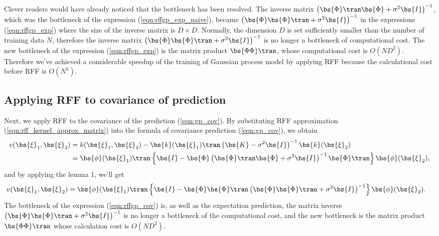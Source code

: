\documentclass[twocolumn,a4paper,10pt]{article}
\begin{document}
Clever readers would have already noticed that the bottleneck has been resolved.
The inverse matrix $\bigl( \bs{\Phi}\tran \bs{\Phi} + \sigma^2 \bs{I} \bigr)^{-1}$,
which was the bottleneck of the expression (\ref{eqn:rffgp_exp_naive}),
became $\bigl( \bs{\Phi} \bs{\Phi}\tran + \sigma^2 \bs{I} \bigr)^{-1}$ in the expressions (\ref{eqn:rffgp_exp})
where the size of the inverse matrix is $D \times D$.
Normally, the dimension $D$ is set sufficiently smaller than the number of training data $N$,
therefore the inverse matrix $\bigl( \bs{\Phi} \bs{\Phi}\tran + \sigma^2 \bs{I} \bigr)^{-1}$
is no longer a bottleneck of computational cost.
The new bottleneck of the expression (\ref{eqn:rffgp_exp}) is the matrix product $\bs{\Phi \Phi}\tran$,
whose computational cost is $O(ND^2)$.
Therefore we've achieved a considerable speedup of the training of Gaussian process model
by applying RFF because the calculational cost before RFF is $O(N^3)$.

\subsection{Applying RFF to covariance of prediction}

Next, we apply RFF to the covariance of the prediction (\ref{eqn:gp_cov}).
By substituting RFF approximation (\ref{eqn:rff_kernel_approx_matrix}) into the formula of
covariance prediction (\ref{eqn:gp_cov}), we obtain
\begin{align}
    v (\bs{\xi}_1, \bs{\xi}_2)
    &= k (\bs{\xi}_1, \bs{\xi}_2) - \bs{k} (\bs{\xi}_1)\tran
    \left( \bs{K} - \sigma^2 \bs{I} \right)^{-1} \bs{k} (\bs{\xi}_2) \notag \\
    &= \bs{\phi}(\bs{\xi}_1)\tran \left\{ \bs{I} - \bs{\Phi}
    \left( \bs{\Phi}\tran \bs{\Phi} + \sigma^2 \bs{I} \right)^{-1}
    \bs{\Phi}\tran \right\} \bs{\phi}(\bs{\xi}_2),
\end{align}
and by applying the lemma 1, we'll get
\begin{align}
    v (\bs{\xi}_1, \bs{\xi}_2)
    &= \bs{\phi}(\bs{\xi}_1)\tran \left\{ \bs{I} - \bs{\Phi} \bs{\Phi}\tran
    \left( \bs{\Phi} \bs{\Phi}\tran + \sigma^2 \bs{I} \right)^{-1} \right\} \bs{\phi}(\bs{\xi}_2).
    \label{eqn:rffgp_cov}
\end{align}
The bottleneck of the expression (\ref{eqn:rffgp_cov}) is, as well as the expectation prediction,
the matrix inverse $\left( \bs{\Phi} \bs{\Phi}\tran + \sigma^2 \bs{I} \right)^{-1}$ is
no longer a bottleneck of the computational cost, and the new bottleneck is the matrix product
$\bs{\Phi \Phi}\tran$ whose calculation cost is $O(ND^2)$.
\end{document}
